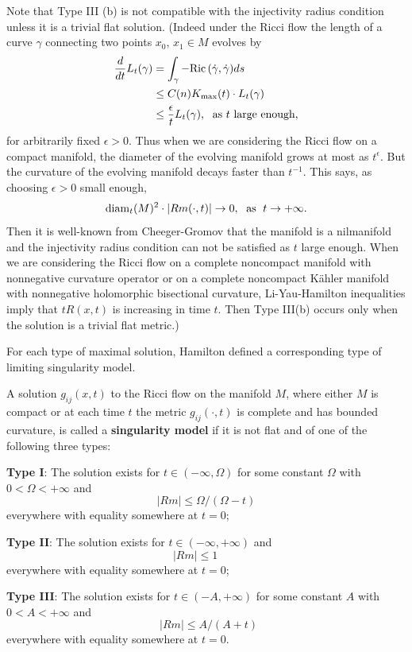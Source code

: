 Note that Type III (b) is not compatible with the injectivity
radius condition unless it is a trivial flat solution. (Indeed
under the Ricci flow the length of a curve $\gamma$ connecting two
points $x_0$, $x_1\in M$ evolves by
\begin{align*}
\frac{d}{dt}L_t(\gamma)
&  = \int_{\gamma}-{\rm Ric}\,(\dot{\gamma},\dot{\gamma})ds\\
&  \leq C(n)K_{\max}(t)\cdot L_t(\gamma)\\
&  \leq \frac{\epsilon}{t}L_t(\gamma),\; \text{ as $t$ large
enough,}
\end{align*}
for arbitrarily fixed $\epsilon>0$. Thus when we are considering
the Ricci flow on a compact manifold, the diameter of the evolving
manifold grows at most as $t^{\epsilon}$. But the curvature of the
evolving manifold decays faster than $t^{-1}$. This says, as
choosing $\epsilon>0$ small enough,
$$
{\rm diam}_t(M)^2\cdot |Rm(\cdot,t)|\rightarrow0,\; \text{ as }\;
t\rightarrow+\infty.
$$
Then it is well-known from Cheeger-Gromov \cite{Gro78} that the
manifold is a nilmanifold and the injectivity radius condition can
not be satisfied as $t$ large enough. When we are considering the
Ricci flow on a complete noncompact manifold with nonnegative
curvature operator or on a complete noncompact K\"ahler manifold
with nonnegative holomorphic bisectional curvature,
Li-Yau-Hamilton inequalities imply that $tR(x,t)$ is increasing in
time $t$. Then Type III(b) occurs only when the solution is a
trivial flat metric.)

For each type of maximal solution, Hamilton \cite{Ha95F} defined a
corresponding type of limiting singularity model.

\begin{definition}
  \label{def:cz-singularity-types-for-maximal-ricci-flows}
A solution $g_{ij}(x,t)$ to the Ricci flow on the manifold $M$,
where either $M$ is compact or at each time $t$ the metric
$g_{ij}(\cdot,t)$ is complete and has bounded curvature, is called
a {\bf singularity model} if it is not
flat and of one of the following three types:

\vskip 0.1cm\noindent \textbf{Type I}: The solution
exists for $t\in(-\infty,\Omega)$ for some constant $\Omega$ with
$0<\Omega<+\infty$ and
$$
|Rm|\leq\Omega/(\Omega-t)
$$
everywhere with equality somewhere at $t=0$;

\vskip 0.1cm\noindent \textbf{Type II}: The
solution exists for $t\in(-\infty,+\infty)$  and
$$
|Rm|\leq 1 \ \ \ \ \ \ \ \ \
$$
everywhere with equality somewhere at $t=0$;

\vskip 0.1cm\noindent \textbf{Type III}: The
solution exists for $t\in(-A,+\infty)$ for some constant $A$ with
$0<A<+\infty$ and
$$
\ \ |Rm|\leq A/(A+t)
$$
everywhere with equality somewhere at $t=0$.
\end{definition}

